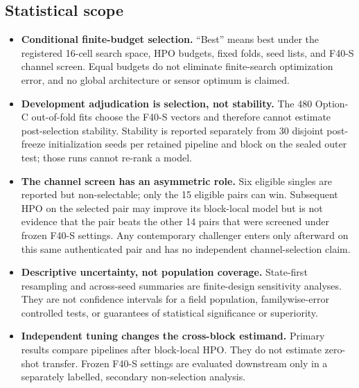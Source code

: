 \subsection{Statistical scope}

\begin{itemize}
  \item \textbf{Conditional finite-budget selection.} ``Best'' means best
  under the registered 16-cell search space, HPO budgets, fixed folds, seed
  lists, and F40-S channel screen. Equal budgets do not eliminate finite-search
  optimization error, and no global architecture or sensor optimum is claimed.

  \item \textbf{Development adjudication is selection, not stability.} The
  480 Option-C out-of-fold fits choose the F40-S vectors and therefore cannot
  estimate post-selection stability. Stability is reported separately from 30
  disjoint post-freeze initialization seeds per retained pipeline and block on
  the sealed outer test; those runs cannot re-rank a model.

  \item \textbf{The channel screen has an asymmetric role.} Six eligible singles are
  reported but non-selectable; only the 15 eligible pairs can win. Subsequent HPO on the
  selected pair may improve its block-local model but is not evidence that the
  pair beats the other 14 pairs that were screened under frozen F40-S settings.
  Any contemporary challenger enters only afterward on this same authenticated
  pair and has no independent channel-selection claim.

  \item \textbf{Descriptive uncertainty, not population coverage.} State-first
  resampling and across-seed summaries are finite-design sensitivity analyses.
  They are not confidence intervals for a field population, familywise-error
  controlled tests, or guarantees of statistical significance or superiority.

  \item \textbf{Independent tuning changes the cross-block estimand.} Primary
  results compare pipelines after block-local HPO. They do not estimate
  zero-shot transfer. Frozen F40-S settings are evaluated downstream only in a
  separately labelled, secondary non-selection analysis.


\end{itemize}

